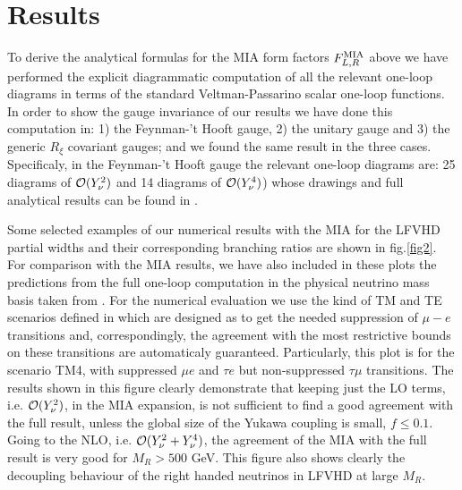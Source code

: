 \documentclass{PoS}
\begin{document}
\section{Results}
To derive the analytical formulas for the MIA form factors $F_{L,R}^{{\rm MIA}}$ above we have performed the explicit diagrammatic computation of all the relevant one-loop diagrams in terms of the standard Veltman-Passarino scalar one-loop functions. In order to show the gauge invariance of our results we have done this computation in: 1) the Feynman-'t Hooft gauge, 2) the unitary gauge and 3) the generic  $R_\xi$ covariant gauges; and we found the same result in the three cases. Specificaly, in the Feynman-'t Hooft gauge the relevant one-loop diagrams are: 25 diagrams of  
${\cal O}(Y_\nu^2)$ and 14 diagrams of ${\cal O}(Y_\nu^4)$) whose drawings and full analytical results can be found in \cite{Arganda:2017vdb}. 

Some selected examples of our numerical results with the MIA for the LFVHD partial widths and their corresponding branching ratios are shown in fig.\ref{fig2}. For comparison with the MIA results, we have also included in these plots the predictions from the full one-loop computation in the physical neutrino mass basis taken from \cite{Arganda:2014dta}. For the numerical evaluation we use the kind of TM and TE scenarios defined in \cite{Arganda:2014dta} which are designed as to get the needed suppression of $\mu-e$ transitions and, correspondingly, the agreement with the most restrictive bounds on these transitions are automaticaly guaranteed. Particularly, this plot is for the scenario TM4, with suppressed $\mu e$ and $\tau e$ but non-suppressed $\tau \mu$ transitions. The results shown in this figure clearly demonstrate that keeping just the LO terms, i.e. ${\cal O}(Y_\nu^2)$, in the MIA expansion, is not sufficient to find a good agreement with the full result, unless the global size of the Yukawa coupling is small, $f \leq 0.1$. Going to the NLO, i.e. ${\cal O}(Y_\nu^2+Y_\nu^4)$, the agreement of the MIA with the full result is very good for $M_R >500$ GeV. This figure also shows clearly the decoupling behaviour of the right handed neutrinos in LFVHD  at large $M_R$.      
 
\end{document}
